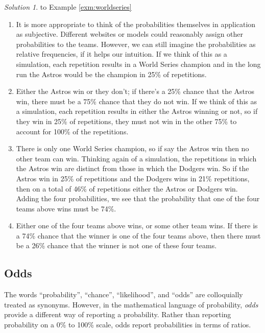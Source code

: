 \documentclass[
]{book}
\providecommand{\tightlist}{%
  \setlength{\itemsep}{0pt}\setlength{\parskip}{0pt}}
\theoremstyle{definition}
\theoremstyle{definition}
\theoremstyle{definition}
\theoremstyle{remark}
\newtheorem*{solution}{Solution}
\begin{document}
\begin{solution}
{}
to Example \ref{exm:worldseries}
\end{solution}

\begin{enumerate}
\def\labelenumi{\arabic{enumi}.}
\tightlist
\item
  It is more appropriate to think of the probabilities themselves in application as subjective. Different websites or models could reasonably assign other probabilities to the teams. However, we can still imagine the probabilities as relative frequencies, if it helps our intuition. If we think of this as a simulation, each repetition results in a World Series champion and in the long run the Astros would be the champion in 25\% of repetitions.
\item
  Either the Astros win or they don't; if there's a 25\% chance that the Astros win, there must be a 75\% chance that they do not win. If we think of this as a simulation, each repetition results in either the Astros winning or not, so if they win in 25\% of repetitions, they must not win in the other 75\% to account for 100\% of the repetitions.
\item
  There is only one World Series champion, so if say the Astros win then no other team can win. Thinking again of a simulation, the repetitions in which the Astros win are distinct from those in which the Dodgers win. So if the Astros win in 25\% of repetitions and the Dodgers wins in 21\% repetitions, then on a total of 46\% of repetitions either the Astros or Dodgers win. Adding the four probabilities, we see that the probability that one of the four teams above wins must be 74\%.
\item
  Either one of the four teams above wins, or some other team wins. If there is a 74\% chance that the winner is one of the four teams above, then there must be a 26\% chance that the winner is not one of these four teams.
\end{enumerate}

\hypertarget{odds}{%
\subsection{Odds}\label{odds}}

The words ``probability'', ``chance'', ``likelihood'', and ``odds'' are colloquially treated as synonyms. However, in the mathematical language of probability, \emph{odds} provide a different way of reporting a probability. Rather than reporting probability on a 0\% to 100\% scale, odds report probabilities in terms of ratios.
\end{document}
